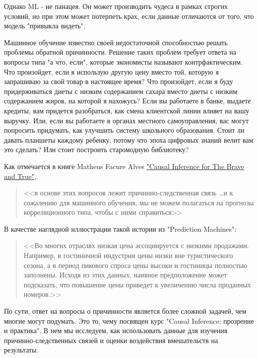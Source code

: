 \documentclass{article}
\newcommand{\coursename}{Causal Inference: прозрение и практика}
\begin{document}
        Однако ML - не панацея.
        Он может производить чудеса в рамках строгих условий, но при этом может потерпеть крах, если данные отличаются от того, что модель "привыкла видеть".

        Машинное обучение известно своей недостаточной способностью решать проблемы обратной причинности.
        Решение таких проблем требует ответа на вопросы типа "а что, если"{}, которые экономисты называют контрфактическим.
        Что произойдет, если я использую другую цену вместо той, которую я запрашиваю за свой товар в настоящее время?
        Что произойдет, если я буду придерживаться диеты с низким содержанием сахара вместо диеты с низким содержанием жиров, на которой я нахожусь?
        Если вы работаете в банке, выдаете кредиты, вам придется разобраться, как смена клиентской линии влияет на вашу выручку.
        Или, если вы работаете в органах местного самоуправления, вас могут попросить придумать, как улучшить систему школьного образования.
        Стоит ли давать планшеты каждому ребенку, потому что эпоха цифровых знаний велит вам это сделать?
        Или стоит построить старомодную библиотеку?

        Как отмечается в книге Matheus Facure Alves \href{https://matheusfacure.github.io/python-causality-handbook/landing-page.html}{"Causal Inference for The Brave and True"}{},
        \begin{quote}
            <<в основе этих вопросов лежит причинно-следственная связь \ldots и к сожалению для машинного обучения, мы не можем полагаться на прогнозы корреляционного типа, чтобы с ними справиться>>
        \end{quote}
        В качестве наглядной иллюстрации такой истории из "Prediction Machines":
        \begin{quote}
            <<Во многих отраслях низкая цена ассоциируется с низкими продажами.
            Например, в гостиничной индустрии цены низки вне туристического сезона, а в период пикового спроса цены высоки и гостиницы полностью заполнены.
            Исходя из этих данных, наивное предположение может подсказать, что повышение цены приведет к увеличению числа проданных номеров.>>
        \end{quote}

        По сути, ответ на вопросы о причинности является более сложной задачей, чем многие могут подумать.
        Это то, чему посвящен курс "\coursename".
        В нем мы исследуем, как использовать данные для изучения причинно-следственных связей и оценки воздействия вмешательств на результаты.
\end{document}
